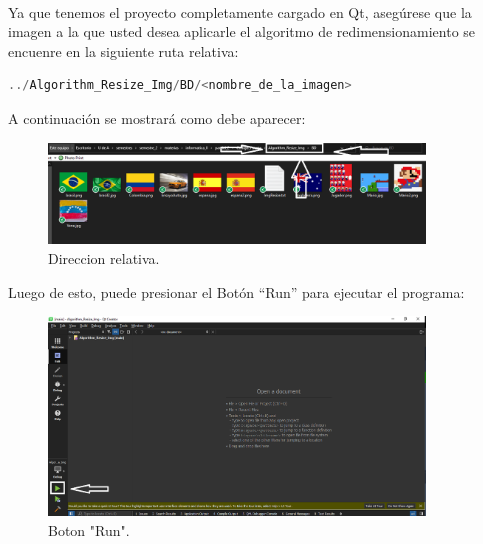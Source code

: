 \documentclass{article}
\begin{document}
\\
Ya que tenemos el proyecto completamente cargado en Qt, asegúrese que la imagen a la que usted desea aplicarle el algoritmo de redimensionamiento se encuenre en la siguiente ruta relativa:
\begin{lstlisting}[language=C++, label=codigo_matrices_int]
../Algorithm_Resize_Img/BD/<nombre_de_la_imagen>
\end{lstlisting}
A continuación se mostrará como debe aparecer:
\begin{figure}[h]
  \includegraphics[width=10cm]{carpetaBD.PNG}
  \centering
  \caption{Direccion relativa.}
  \label{fig:carpetaBD}
\end{figure}
Luego de esto, puede presionar el Botón “Run” para ejecutar el programa:
\begin{figure}[h]
  \includegraphics[width=10cm]{run.PNG}
  \centering
  \caption{Boton "Run".}
  \label{fig:run}
\end{figure}
\end{document}
